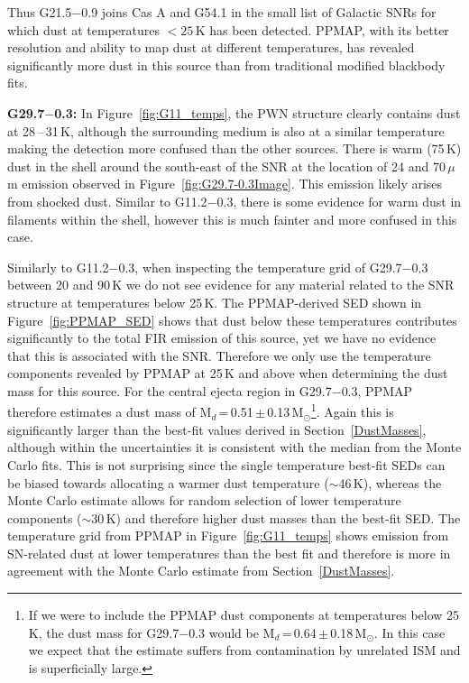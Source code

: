 \documentclass[fleqn,usenatbib]{mnras}
\newcommand\PPMAPMassc{0.51}
\newcommand\PPMAPMassErrc{0.13}
\newcommand\PPMAPMasscWide{0.64}
\newcommand\PPMAPMassErrcWide{0.18}
\begin{document}
{{Thus G21.5$-$0.9 joins Cas A and G54.1 in the small list of Galactic SNRs for which dust at temperatures $<25$\,K has been detected. PPMAP, with its better resolution and ability to map dust at different temperatures, has revealed significantly more dust in this source than from traditional modified blackbody fits.

\bigskip

\textbf{G29.7$-$0.3:}
In Figure~\ref{fig:G11_temps}, the PWN structure clearly contains dust at 28\,--\,31\,K, although the surrounding medium is also at a similar temperature making the detection more confused than the other sources. There is warm (75\,K) dust in the shell around the south-east of the SNR at the location of 24 and 70\,$\mu$m emission observed in Figure~\ref{fig:G29.7-0.3Image}. This emission likely arises from shocked dust. Similar to G11.2$-$0.3, there is some evidence for warm dust in filaments within the shell, however this is much fainter and more confused in this case.

{Similarly to G11.2$-$0.3, when inspecting the temperature grid of G29.7$-$0.3 between 20 and 90\,K we do not see evidence for any material related to the SNR structure at temperatures below 25\,K.  The PPMAP-derived SED shown in Figure~\ref{fig:PPMAP_SED} shows that dust below these temperatures contributes significantly to the total FIR emission of this source, yet we have no evidence that this is associated with the SNR. Therefore we only use the temperature components revealed by PPMAP at 25\,K and above when determining the dust mass for this source. For the central ejecta region in G29.7$-$0.3, PPMAP therefore estimates a dust mass of M$_d$\,=\,\PPMAPMassc\,$\pm$\,\PPMAPMassErrc\,M$_\odot$\footnote{If we were to include the PPMAP dust components at temperatures below 25\,K, the dust mass for G29.7$-$0.3 would be M$_d$\,=\,\PPMAPMasscWide\,$\pm$\,\PPMAPMassErrcWide\,M$_\odot$. In this case we expect that the estimate suffers from contamination by unrelated ISM and is superficially large.}. Again this is significantly larger than the best-fit values derived in Section~\ref{DustMasses}, although within the uncertainties it is consistent with the median from the Monte Carlo fits. This is not surprising since the single temperature best-fit SEDs can be biased towards allocating a warmer dust temperature ($\sim$46\,K), whereas the Monte Carlo estimate allows for random selection of lower temperature components ($\sim$30\,K) and therefore higher dust masses than the best-fit SED. The temperature grid from PPMAP in Figure~\ref{fig:G11_temps} shows emission from SN-related dust at lower temperatures than the best fit and therefore is more in agreement with the Monte Carlo estimate from Section~\ref{DustMasses}.
}



}}
\end{document}
